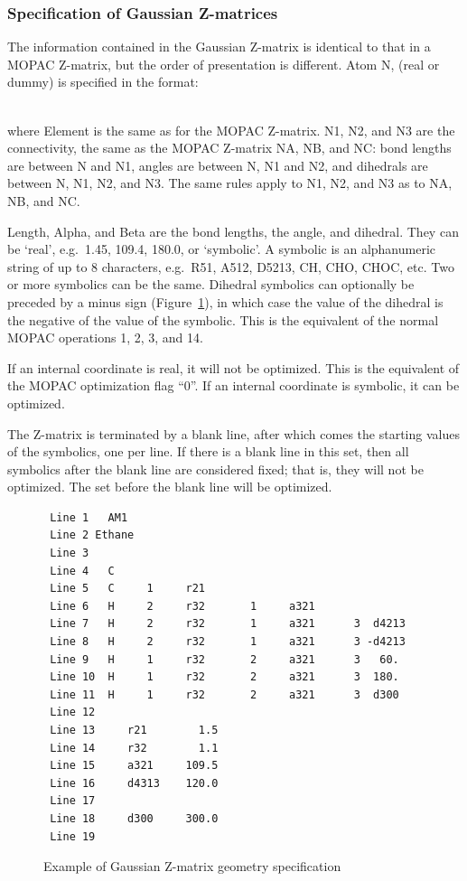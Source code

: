 \subsubsection{Specification of Gaussian Z-matrices}
The information contained in the Gaussian Z-matrix is  identical  to that  in a
MOPAC Z-matrix, but the order of presentation is different.  Atom N, (real or
dummy) is specified in the format:

\\
where Element is the same as for the MOPAC Z-matrix.  N1, N2, and N3  are the
connectivity,  the  same as the MOPAC Z-matrix NA, NB, and NC:  bond lengths
are between N and N1, angles  are  between  N,  N1  and  N2,  and dihedrals are
between N, N1, N2, and N3.  The same rules apply to N1, N2, and N3 as to NA,
NB, and NC.

Length, Alpha, and  Beta  are  the  bond  lengths,  the  angle,  and
dihedral.   They  can be `real', e.g.\  1.45, 109.4, 180.0, or `symbolic'. A
symbolic is an alphanumeric string of up to 8  characters,  e.g.\  R51, A512,
D5213, CH, CHO, CHOC, etc.  Two or more symbolics can be the same. Dihedral
symbolics can optionally be preceded by a minus sign (Figure~\ref{gzmat}), in
which case  the  value  of  the  dihedral  is  the negative of the value of the
symbolic.  This is the equivalent of the normal MOPAC 
operations 1, 2, 3, and 14.

If an internal coordinate is real, it will not be  optimized.   This is  the
equivalent  of  the MOPAC optimization flag ``0''.  If an internal coordinate
is symbolic, it can be optimized.

The Z-matrix is terminated by a blank line, after  which  comes  the starting
values of the symbolics, one per line.  If there is a blank line in this set,
then all symbolics  after  the  blank  line  are  considered fixed;  that  is,
they  will not be optimized.  The set before the blank line will be optimized.

\begin{figure}
\begin{makeimage}
\end{makeimage}
\begin{verbatim}
 Line 1   AM1
 Line 2 Ethane
 Line 3
 Line 4   C
 Line 5   C     1     r21
 Line 6   H     2     r32       1     a321
 Line 7   H     2     r32       1     a321      3  d4213
 Line 8   H     2     r32       1     a321      3 -d4213
 Line 9   H     1     r32       2     a321      3   60.
 Line 10  H     1     r32       2     a321      3  180.
 Line 11  H     1     r32       2     a321      3  d300
 Line 12
 Line 13     r21        1.5
 Line 14     r32        1.1
 Line 15     a321     109.5
 Line 16     d4313    120.0
 Line 17
 Line 18     d300     300.0
 Line 19
\end{verbatim}
\caption{\label{gzmat}Example of Gaussian Z-matrix geometry specification}
\end{figure}

